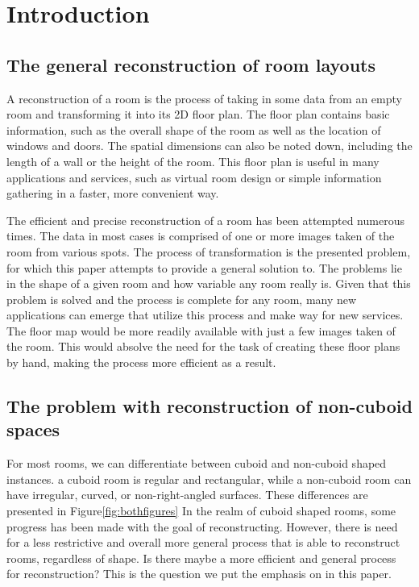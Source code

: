 \section{Introduction}

\subsection{The general reconstruction of room layouts} %
A reconstruction of a room is the process of taking in some data from an empty room and transforming it into its 2D floor plan. The floor plan contains basic information, such as the overall shape of the room as well as the location of windows and doors. The spatial dimensions can also be noted down, including the length of a wall or the height of the room. This floor plan is useful in many applications and services, such as virtual room design or simple information gathering in a faster, more convenient way. 

The efficient and precise reconstruction of a room has been attempted numerous
times. The data in most cases is comprised of one or more images taken of the room from various spots. The process of transformation is the presented problem, for which this paper attempts to provide a general solution to. The problems lie in the shape of a given room and how variable any room really is. Given that this problem is solved and the process is complete for any room, many new applications can emerge that utilize this process and make way for new services. The floor map would be more readily available with just a few images taken of the room. This would absolve the need for the task of creating these floor plans by hand, making the process more efficient as a result.

\subsection{The problem with reconstruction of non-cuboid spaces} %
For most rooms, we can differentiate between cuboid and non-cuboid shaped instances. a cuboid room is regular and rectangular, while a non-cuboid room can have irregular, curved, or non-right-angled surfaces. These differences are presented in Figure\ref{fig:bothfigures} In the realm of cuboid shaped rooms, some progress has been made with the goal of reconstructing. However, there is need for a less restrictive and overall more general process that is able to reconstruct rooms, regardless of shape. Is there maybe a more efficient and general process for reconstruction? This is the question we put the emphasis on in this paper.

